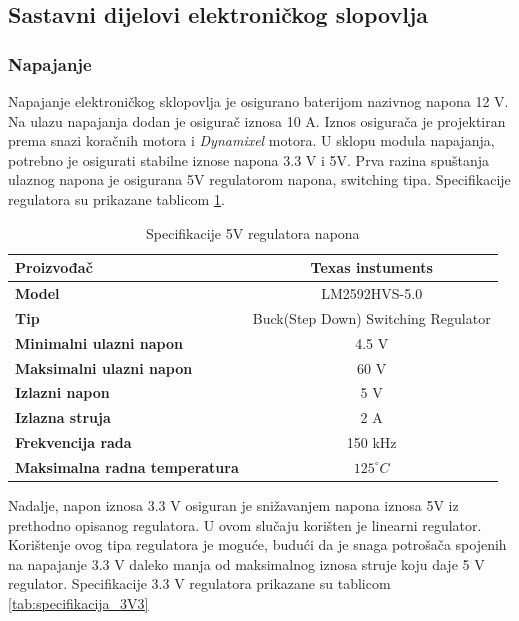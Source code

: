 \documentclass[11pt,a4paper]{article}
\begin{document}
\subsection{Sastavni dijelovi elektroničkog slopovlja}

\subsubsection{Napajanje}
Napajanje elektroničkog sklopovlja je osigurano baterijom nazivnog napona 12 V. Na ulazu napajanja dodan je osigurač iznosa 10 A. Iznos osigurača je projektiran prema snazi koračnih motora i \textit{Dynamixel} motora. U sklopu modula napajanja, potrebno je osigurati stabilne iznose napona 3.3 V i 5V. Prva razina spuštanja ulaznog napona je osigurana 5V regulatorom napona, switching tipa. Specifikacije regulatora su prikazane tablicom \ref{tab:specifikacija_5V}.


\begin{table}[H]
	\centering
	\caption{Specifikacije 5V regulatora napona}
	\label{tab:specifikacija_5V}
	\begin{tabular}{|l|c|}
		\hline
		\textbf{Proizvođač} & Texas instuments  \\ \hline 
		\textbf{Model} &  LM2592HVS-5.0  \\ \hline 
		\textbf{Tip} &  Buck(Step Down) Switching Regulator  \\ \hline 
		\textbf{Minimalni ulazni napon} & 4.5 V \\ \hline 
		\textbf{Maksimalni ulazni napon} & 60 V \\ \hline 
		\textbf{Izlazni napon} & 5 V \\ \hline 
		\textbf{Izlazna struja} & 2 A \\ \hline 
		\textbf{Frekvencija rada} & 150 kHz \\ \hline 
		\textbf{Maksimalna radna temperatura} & $125 ^\circ C$ \\ \hline 
	\end{tabular}
\end{table}

Nadalje, napon iznosa 3.3 V osiguran je snižavanjem napona iznosa 5V iz prethodno opisanog regulatora. U ovom slučaju korišten je linearni regulator. Korištenje ovog tipa regulatora je moguće, budući da je snaga potrošača spojenih na napajanje 3.3 V daleko manja od maksimalnog iznosa struje koju daje 5 V regulator. Specifikacije 3.3 V regulatora prikazane su tablicom \ref{tab:specifikacija_3V3}
\end{document}
